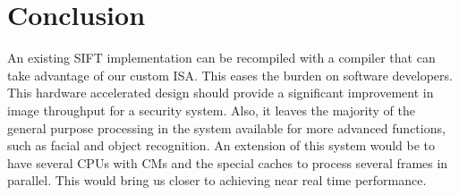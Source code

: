 \section{Conclusion}
An existing SIFT implementation can be recompiled with a compiler that can take advantage of our custom ISA. This eases the burden on software developers. This hardware accelerated design should provide a significant improvement in image throughput for a security system. Also, it leaves the majority of the general purpose processing in the system available for more advanced functions, such as facial and object recognition. An extension of this system would be to have several CPUs with CMs and the special caches to process several frames in parallel. This would bring us closer to achieving near real time performance.
